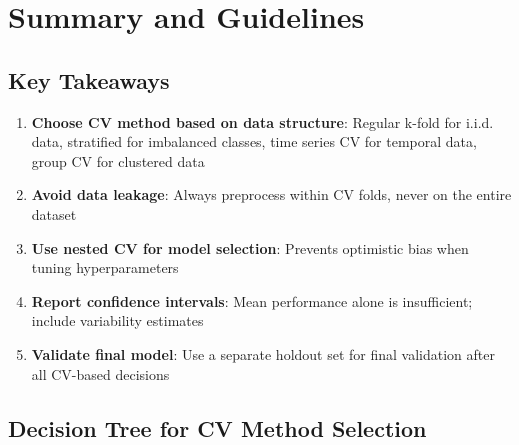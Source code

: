\documentclass{article}
\begin{document}
\section{Summary and Guidelines}

\subsection{Key Takeaways}

\begin{enumerate}
    \item \textbf{Choose CV method based on data structure}: Regular k-fold for i.i.d. data, stratified for imbalanced classes, time series CV for temporal data, group CV for clustered data
    
    \item \textbf{Avoid data leakage}: Always preprocess within CV folds, never on the entire dataset
    
    \item \textbf{Use nested CV for model selection}: Prevents optimistic bias when tuning hyperparameters
    
    \item \textbf{Report confidence intervals}: Mean performance alone is insufficient; include variability estimates
    
    \item \textbf{Validate final model}: Use a separate holdout set for final validation after all CV-based decisions
\end{enumerate}

\subsection{Decision Tree for CV Method Selection}

\begin{center}
\end{center}
\end{document}
